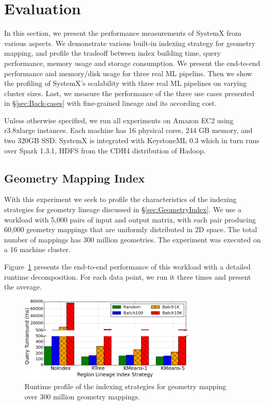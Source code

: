 \documentclass{sig-alternate}
\begin{document}
\section{Evaluation}
\label{sec:Perf}
In this section, we present the performance measurements of SystemX from various aspects.
We demonstrate various built-in indexing strategy for geometry mapping, and profile the tradeoff
between index building time, query performance, memory usage and storage consumption.
We present the end-to-end performance and memory/disk usage for three real ML pipelins.
Then we show the profiling of SystemX's scalability with three real ML pipelines on varying cluster sizes.
Last, we measure the performance of the three use cases presented in \S\ref{sec:Back-cases} with 
fine-grained lineage and its according cost.

Unless otherwise specified, we run all experiments on Amazon EC2 using r3.8xlarge instances.
Each machine has 16 physical cores, 244 GB memory, and two 320GB SSD. 
SystemX is integrated with KeystoneML 0.3 which in turn runs over Spark 1.3.1, HDFS from the
CDH4 distribution of Hadoop. 

\subsection{Geometry Mapping Index}
\label{sec:Perf-Index}
With this experiment we seek to profile the characteristics of the indexing strategies for geometry lineage discussed in \S\ref{sec:GeometryIndex}.
We use a workload with 5,000 pairs of input and output matrix, with each pair producing 60,000 geometry mappings that are uniformly distributed
in 2D space. The total number of mappings has 300 million geometries. The experiment was executed on a 16 machine cluster.

Figure~\ref{fig:sift-time} presents the end-to-end performance of this workload with a detailed runtime decomposition. For each data point, 
we run it three times and present the average. 

\begin{figure}[t]
\begin{center}
    \includegraphics[width=85mm]{pictures/SIFTIndex-Time}
\caption {Runtime profile of the indexing strategies for geometry mapping over 300 million geometry mappings.
    \label{fig:sift-time}
}
\end{center}
\end{figure}
\end{document}
